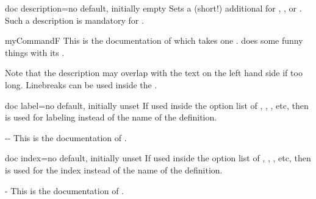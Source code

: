 \clearpage

\begin{docTcbKey}{doc description}{=}{no default, initially empty}
  Sets a (short!) additional  for
  , , or .
  Such a description is
  mandatory for .
\begin{dispExample}
\begin{docCommand*}[doc description=my description]{myCommandF}{}
  This is the documentation of  which takes one .
   does some funny things with its .
\end{docCommand*}
\end{dispExample}
\begin{marker}
Note that the description  may overlap with the text on the left
hand side if too long. Linebreaks can be used inside the .
\end{marker}
\end{docTcbKey}


\begin{docTcbKey}[][doc new={2019-09-18}]{doc label}{=}{no default, initially unset}
  If used inside the option list of , ,
  , etc, then  is used
  for labeling instead of the name of the definition.
\begin{dispExample}
\begin{docPathOperation*}[doc label=pathline]{-{}-}{}
  This is the documentation of .
\end{docPathOperation*}
\end{dispExample}
\end{docTcbKey}

\begin{docTcbKey}[][doc new={2020-01-07}]{doc index}{=}{no default, initially unset}
  If used inside the option list of , ,
  , etc, then  is used
  for the index instead of the name of the definition.
\begin{dispExample}
\begin{docPathOperation}[doc index=foo path (horizontal then vertical),
    doc label=pathline2]{-\textbar}{}
  This is the documentation of .
\end{docPathOperation}
\end{dispExample}
\end{docTcbKey}



